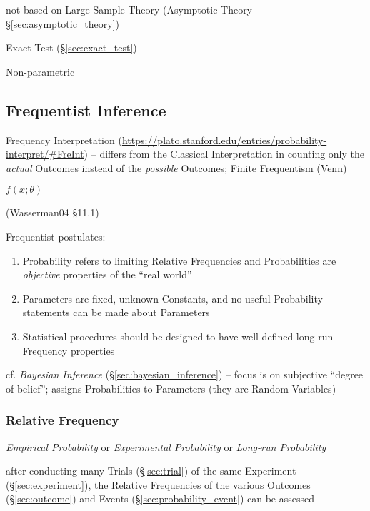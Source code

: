 not based on Large Sample Theory (Asymptotic Theory
\S\ref{sec:asymptotic_theory})

\fist Exact Test (\S\ref{sec:exact_test})

Non-parametric



\subsection{Frequentist Inference}\label{sec:frequentist_inference}

Frequency Interpretation
(\url{https://plato.stanford.edu/entries/probability-interpret/#FreInt}) --
differs from the Classical Interpretation in counting only the \emph{actual}
Outcomes instead of the \emph{possible} Outcomes; Finite Frequentism (Venn)

$f(x; \theta)$

(Wasserman04 \S11.1)

Frequentist postulates:
\begin{enumerate}
  \item Probability refers to limiting Relative Frequencies and Probabilities
    are \emph{objective} properties of the ``real world''
  \item Parameters are fixed, unknown Constants, and no useful Probability
    statements can be made about Parameters
  \item Statistical procedures should be designed to have well-defined long-run
    Frequency properties
\end{enumerate}

cf. \emph{Bayesian Inference} (\S\ref{sec:bayesian_inference}) -- focus is on
subjective ``degree of belief''; assigns Probabilities to Parameters (they are
Random Variables)



\subsubsection{Relative Frequency}\label{sec:relative_frequency}

\emph{Empirical Probability} or \emph{Experimental Probability} or
\emph{Long-run Probability}

after conducting many Trials (\S\ref{sec:trial}) of the same Experiment
(\S\ref{sec:experiment}), the Relative Frequencies of the various Outcomes
(\S\ref{sec:outcome}) and Events (\S\ref{sec:probability_event}) can be assessed


